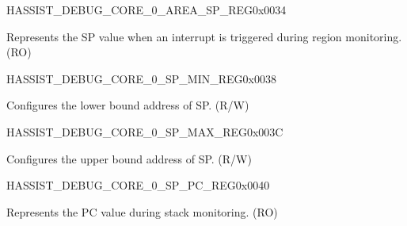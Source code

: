 \begin{register}{H}{ASSIST\_DEBUG\_CORE\_0\_AREA\_SP\_REG}{0x0034}\label{regdesc:ASSISTDEBUGCORE0AREASPREG}
%
\regnewline%
\begin{regdesc}\begin{reglist}
\label{fielddesc:ASSISTDEBUGCORE0AREASP}\item [ASSIST\_DEBUG\_CORE\_0\_AREA\_SP] Represents the SP value when an interrupt is triggered during region monitoring. (RO)
\end{reglist}\end{regdesc}
\end{register}


\begin{register}{H}{ASSIST\_DEBUG\_CORE\_0\_SP\_MIN\_REG}{0x0038}\label{regdesc:ASSISTDEBUGCORE0SPMINREG}
%
\regnewline%
\begin{regdesc}\begin{reglist}
\label{fielddesc:ASSISTDEBUGCORE0SPMIN}\item [ASSIST\_DEBUG\_CORE\_0\_SP\_MIN] Configures the lower bound address of SP. (R/W)
\end{reglist}\end{regdesc}
\end{register}


\begin{register}{H}{ASSIST\_DEBUG\_CORE\_0\_SP\_MAX\_REG}{0x003C}\label{regdesc:ASSISTDEBUGCORE0SPMAXREG}
%
\regnewline%
\begin{regdesc}\begin{reglist}
\label{fielddesc:ASSISTDEBUGCORE0SPMAX}\item [ASSIST\_DEBUG\_CORE\_0\_SP\_MAX] Configures the upper bound address of SP. (R/W)
\end{reglist}\end{regdesc}
\end{register}


\begin{register}{H}{ASSIST\_DEBUG\_CORE\_0\_SP\_PC\_REG}{0x0040}\label{regdesc:ASSISTDEBUGCORE0SPPCREG}
%
\regnewline%
\begin{regdesc}\begin{reglist}
\label{fielddesc:ASSISTDEBUGCORE0SPPC}\item [ASSIST\_DEBUG\_CORE\_0\_SP\_PC] Represents the PC value during stack monitoring. (RO)
\end{reglist}\end{regdesc}
\end{register}


